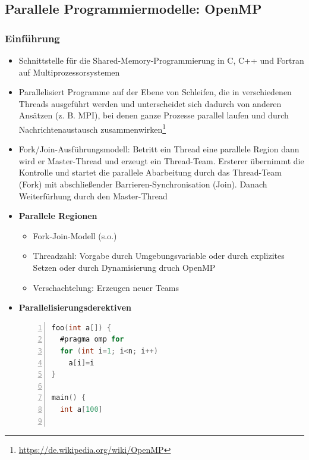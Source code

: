 \subsection{Parallele Programmiermodelle: OpenMP}

\subsubsection{Einführung}
\begin{itemize}
	\item Schnittstelle für die Shared-Memory-Programmierung in C, C++ und Fortran auf Multiprozessorsystemen
	\item Parallelisiert Programme auf der Ebene von Schleifen, die in verschiedenen Threads ausgeführt werden und unterscheidet sich dadurch von anderen Ansätzen (z. B. MPI), bei denen ganze Prozesse parallel laufen und durch Nachrichtenaustausch zusammenwirken\footnote{\url{https://de.wikipedia.org/wiki/OpenMP}}
	\item Fork/Join-Ausführungsmodell: Betritt ein Thread eine parallele Region dann wird er Master-Thread und erzeugt ein Thread-Team. Ersterer  übernimmt die Kontrolle und startet die parallele Abarbeitung durch das Thread-Team (Fork) mit abschließender Barrieren-Synchronisation (Join). Danach Weiterfürhung durch den Master-Thread
	\item \textbf{Parallele Regionen}
	\begin{itemize}
		\item Fork-Join-Modell (s.o.)
		\item Threadzahl: Vorgabe durch Umgebungsvariable oder durch explizites Setzen oder durch Dynamisierung druch OpenMP
		\item Verschachtelung: Erzeugen neuer Teams
	\end{itemize}
	\item \textbf{Parallelisierungsderektiven}
	\begin{lstlisting}[frame=single,numbers=left,mathescape,language=C]
foo(int a[]) {
  #pragma omp for
  for (int i=1; i<n; i++)
    a[i]=i
}

main() {
  int a[100]


\end{lstlisting}
\end{itemize}
